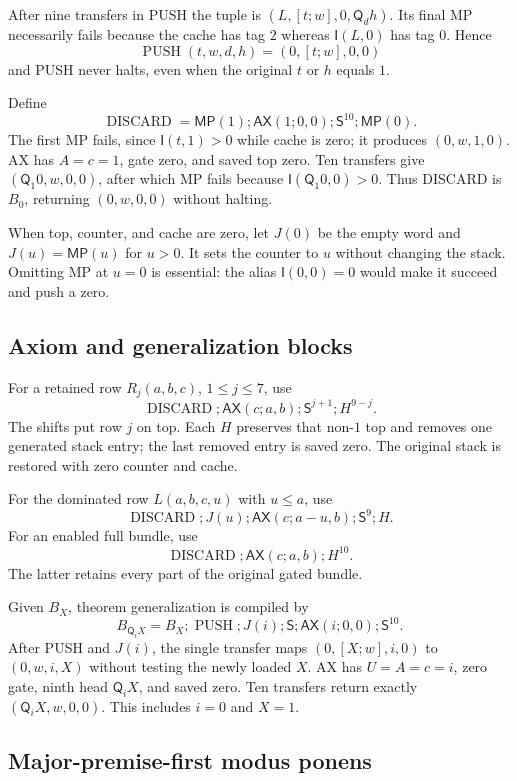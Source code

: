 \documentclass[11pt]{article}
\newcommand{\imp}{\mathsf I}
\newcommand{\quant}{\mathsf Q}
\newcommand{\AX}{\mathsf{AX}}
\newcommand{\MP}{\mathsf{MP}}
\newcommand{\Tr}{\mathsf S}
\begin{document}
After nine transfers in PUSH the tuple is
$(L,[t;w],0,\quant_d h)$. Its final MP necessarily fails because
the cache has tag $2$ whereas $\imp(L,0)$ has tag $0$. Hence
\[
             \operatorname{PUSH}(t,w,d,h)=(0,[t;w],0,0)
\]
and PUSH never halts, even when the original $t$ or $h$ equals $1$.

Define
\[
 \operatorname{DISCARD}
   =\MP(1);\AX(1;0,0);\Tr^{10};\MP(0).
\]
The first MP fails, since $\imp(t,1)>0$ while cache is zero;
it produces $(0,w,1,0)$. AX has $A=c=1$, gate zero, and saved
top zero. Ten transfers give $(\quant_1 0,w,0,0)$, after which
MP fails because $\imp(\quant_1 0,0)>0$. Thus DISCARD is $B_0$,
returning $(0,w,0,0)$ without halting.

When top, counter, and cache are zero, let $J(0)$ be the empty
word and $J(u)=\MP(u)$ for $u>0$. It sets the counter to $u$
without changing the stack. Omitting MP at $u=0$ is essential:
the alias $\imp(0,0)=0$ would make it succeed and push a zero.

\subsection{Axiom and generalization blocks}

For a retained row $R_j(a,b,c)$, $1\le j\le7$, use
\[
 \operatorname{DISCARD};\AX(c;a,b);\Tr^{j+1};H^{9-j}.
\]
The shifts put row $j$ on top. Each $H$ preserves that non-$1$
top and removes one generated stack entry; the last removed
entry is saved zero. The original stack is restored with zero
counter and cache.

For the dominated row $L(a,b,c,u)$ with $u\le a$, use
\[
 \operatorname{DISCARD};J(u);\AX(c;a-u,b);\Tr^9;H.
\]
For an enabled full bundle, use
\[
 \operatorname{DISCARD};\AX(c;a,b);H^{10}.
\]
The latter retains every part of the original gated bundle.

Given $B_X$, theorem generalization is compiled by
\[
 B_{\quant_iX}
   =B_X;\operatorname{PUSH};J(i);\Tr;\AX(i;0,0);\Tr^{10}.
\]
After PUSH and $J(i)$, the single transfer maps
$(0,[X;w],i,0)$ to $(0,w,i,X)$ without testing the newly loaded
$X$. AX has $U=A=c=i$, zero gate, ninth head $\quant_iX$,
and saved zero. Ten transfers return exactly
$(\quant_iX,w,0,0)$. This includes $i=0$ and $X=1$.

\subsection{Major-premise-first modus ponens}
\end{document}
